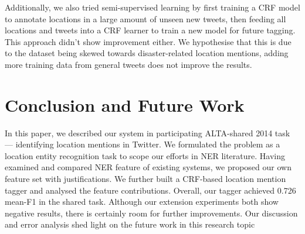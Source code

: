 \documentclass[11pt]{article}
\begin{document}
Additionally, we also tried semi-supervised learning by first training a CRF model to annotate locations in a large amount of unseen new tweets, then feeding all locations and tweets into a CRF learner to train a new model for future tagging.
This approach didn't show improvement either.
We hypothesise that this is due to the dataset being skewed towards disaster-related location mentions, adding more training data from general tweets does not improve the results.

\section{Conclusion and Future Work}
\label{sec:conclusion}
In this paper, we described our system in participating ALTA-shared 2014 task --- identifying location mentions in Twitter.
We formulated the problem as a location entity recognition task to scope our efforts in NER literature.
Having examined and compared NER feature of existing systems, we proposed our own feature set with justifications.
We further built a CRF-based location mention tagger and analysed the feature contributions.
Overall, our tagger achieved 0.726 mean-F1 in the shared task.
Although our extension experiments both show negative results, there is certainly room for further improvements.
Our discussion and error analysis shed light on the future work in this research topic



\end{document}

